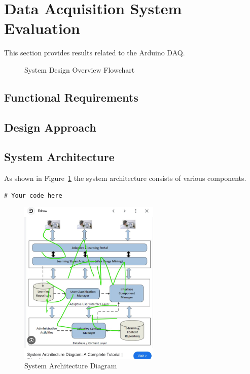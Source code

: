 \section{Data Acquisition System Evaluation}
This section provides results related to the Arduino DAQ.

\begin{figure}[H]
    \centering
    \scalebox{0.8}{ %
        
    }
    \caption{System Design Overview Flowchart}
    \label{fig:decriptiveLabel6} %
\end{figure}

\subsection{Functional Requirements}

\subsection{Design Approach}

\subsection{System Architecture}
As shown in Figure~\ref{fig:decriptiveLabel6} the system architecture consists of various components.

\begin{lstlisting}[style=cstyle, caption=System Architecture Code Example, label=lst:SystemArchitecture5]
# Your code here
\end{lstlisting}

\begin{figure}[htbp] %
    \centering
    \includegraphics[width=0.6\textwidth]{figures/results/system_architecture.jpg}
    \caption{System Architecture Diagram}
    \label{fig:system-architecture21}
\end{figure}
